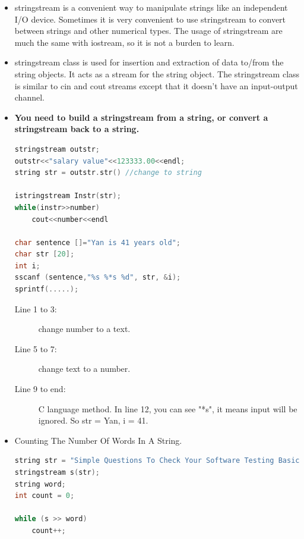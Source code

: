 \documentclass[a4paper,11pt,twoside]{book}
\begin{document}
\begin{itemize}
	
	
	\item stringstream is a convenient way to manipulate strings like an independent I/O device. Sometimes it is very convenient to use stringstream to convert between strings and other numerical types. The usage of stringstream are much the same with iostream, so it is not a burden to learn.
	
	\item stringstream class is used for insertion and extraction of data to/from the string objects. It acts as a stream for the string object. The stringstream class is similar to cin and cout streams except that it doesn’t have an input-output channel.
	
	
	\item \textbf{You need to build a stringstream from a string, or convert a stringstream back to a string.}
	
\begin{lstlisting}[frame=single, language=c++]
stringstream outstr;
outstr<<"salary value"<<123333.00<<endl;
string str = outstr.str() //change to string
	
istringstream Instr(str);
while(instr>>number)
	cout<<number<<endl
	
char sentence []="Yan is 41 years old";
char str [20];
int i;
sscanf (sentence,"%s %*s %d", str, &i);
sprintf(.....);
\end{lstlisting}
\begin{description}
	\item[Line 1 to 3:] change number to a text.
	\item[Line 5 to 7:] change text to a number.
	\item[Line 9 to end:] C language method. In line 12, you can see "*s", it means input will be ignored. So str = Yan, i = 41.
\end{description}

\item Counting The Number Of Words In A String.
\begin{lstlisting}[frame=single, language=c++]
string str = "Simple Questions To Check Your Software Testing Basic Knowledge"; 
stringstream s(str);  
string word; 
int count = 0;
 
while (s >> word) 
	count++;
\end{lstlisting}

\end{itemize}
\end{document}
